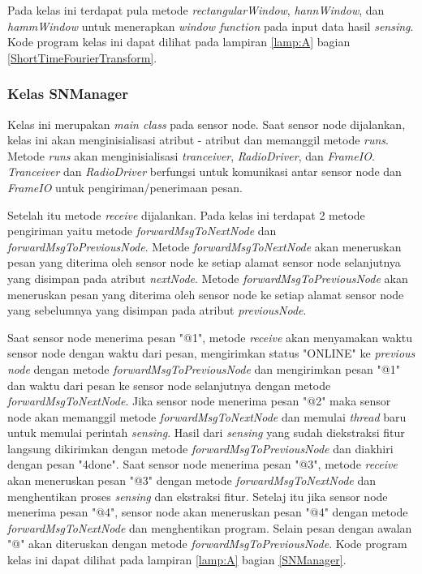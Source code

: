 Pada kelas ini terdapat pula metode {\it rectangularWindow}, {\it hannWindow}, dan {\it hammWindow} untuk menerapkan {\it window function} pada input data hasil {\it sensing}. Kode program kelas ini dapat dilihat pada lampiran \ref{lamp:A} bagian \ref{ShortTimeFourierTransform}.

\subsubsection{Kelas SNManager}
Kelas ini merupakan {\it main class} pada sensor node. Saat sensor node dijalankan, kelas ini akan menginisialisasi atribut - atribut dan memanggil metode {\it runs}. Metode {\it runs} akan menginisialisasi {\it tranceiver}, {\it RadioDriver}, dan {\it FrameIO}. {\it Tranceiver} dan {\it RadioDriver} berfungsi untuk komunikasi antar sensor node dan {\it FrameIO} untuk pengiriman/penerimaan pesan.

Setelah itu metode {\it receive} dijalankan. Pada kelas ini terdapat 2 metode pengiriman yaitu metode {\it forwardMsgToNextNode} dan {\it forwardMsgToPreviousNode}. Metode {\it forwardMsgToNextNode} akan meneruskan pesan yang diterima oleh sensor node ke setiap alamat sensor node selanjutnya yang disimpan pada atribut {\it nextNode}. Metode {\it forwardMsgToPreviousNode} akan meneruskan pesan yang diterima oleh sensor node ke setiap alamat sensor node yang sebelumnya yang disimpan pada atribut {\it previousNode}.

Saat sensor node menerima pesan "@1", metode {\it receive} akan menyamakan waktu sensor node dengan waktu dari pesan,  mengirimkan status "ONLINE" ke {\it previous node} dengan metode {\it forwardMsgToPreviousNode} dan mengirimkan pesan "@1" dan waktu dari pesan ke sensor node selanjutnya dengan metode {\it forwardMsgToNextNode}. Jika sensor node menerima pesan "@2" maka sensor node akan memanggil metode {\it forwardMsgToNextNode} dan memulai {\it thread} baru untuk memulai perintah {\it sensing}. Hasil dari {\it sensing} yang sudah diekstraksi fitur langsung dikirimkan dengan metode {\it forwardMsgToPreviousNode} dan diakhiri dengan pesan "4done". Saat sensor node menerima pesan "@3", metode {\it receive} akan meneruskan pesan "@3" dengan metode {\it forwardMsgToNextNode} dan menghentikan proses {\it sensing} dan ekstraksi fitur. Setelaj itu jika sensor node menerima pesan "@4", sensor node akan meneruskan pesan "@4" dengan metode {\it forwardMsgToNextNode} dan menghentikan program. Selain pesan dengan awalan "@" akan diteruskan dengan metode {\it forwardMsgToPreviousNode}. Kode program kelas ini dapat dilihat pada lampiran \ref{lamp:A} bagian \ref{SNManager}.

